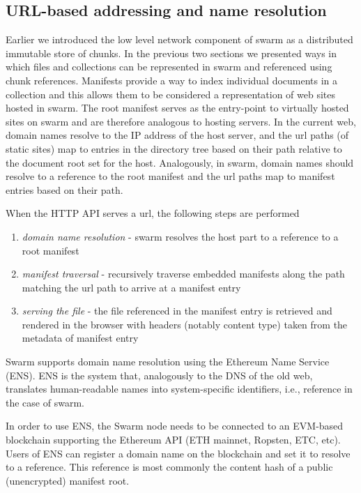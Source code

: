 \subsection{URL-based addressing and name resolution}\label{sec:urls}

Earlier we introduced the low level network component of swarm as a distributed immutable store of chunks. In the previous two sections we presented ways in which files and collections can be represented in swarm and referenced using chunk references. Manifests provide a way to index individual documents in a collection and this allows them to be considered a representation of web sites hosted in swarm. The root manifest serves as the entry-point to virtually hosted sites on swarm and are therefore analogous to hosting servers. In the current web, domain names resolve to the IP address of the host server, and the url paths (of static sites) map to entries in the directory tree based on their path relative to the document root set for the host.
Analogously, in swarm, domain names should resolve to a reference to the root manifest and the url paths map to manifest entries based on their path.  

When the HTTP API serves a url, the following steps are performed

\begin{enumerate}
    \item \emph{domain name resolution} - swarm resolves the host part to a reference to a root manifest
    \item \emph{manifest traversal} - recursively traverse embedded manifests along the path matching the url path to arrive at a manifest entry
    \item \emph{serving the file} - the file referenced in the manifest entry is retrieved and rendered in the browser with headers (notably content type) taken from  the metadata of manifest entry
\end{enumerate}

Swarm supports domain name resolution using the Ethereum Name Service (ENS). ENS is the system that, analogously to the DNS of the old web, translates human-readable names into system-specific identifiers, i.e., reference in the case of swarm.

In order to use ENS, the Swarm node needs to be connected to an EVM-based blockchain supporting the Ethereum API (ETH mainnet, Ropsten, ETC, etc). 
Users of ENS can register a domain name on the blockchain  and set it to resolve to a reference. This reference is most commonly the content hash of a public (unencrypted) manifest root. 


